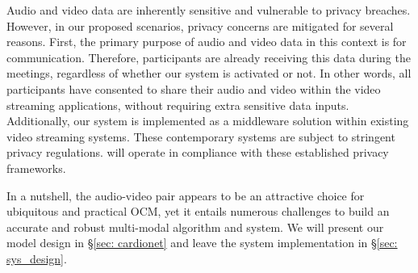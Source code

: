  Audio and video data are inherently sensitive and vulnerable to privacy breaches. However, in our proposed scenarios, privacy concerns are mitigated for several reasons. First, the primary purpose of audio and video data in this context is for communication. Therefore, participants are already receiving this data during the meetings, regardless of whether our system is activated or not. In other words, all participants have consented to share their audio and video within the video streaming applications, without requiring extra sensitive data inputs. Additionally, our system is implemented as a middleware solution within existing video streaming systems. These contemporary systems are subject to stringent privacy regulations. \sysname will operate in compliance with these established privacy frameworks.

In a nutshell, the audio-video pair appears to be an attractive choice for ubiquitous and practical OCM, yet it entails numerous challenges to build an accurate and robust multi-modal algorithm and system. We will present our model design in \S\ref{sec: cardionet} and leave the system implementation in \S\ref{sec: sys_design}.


